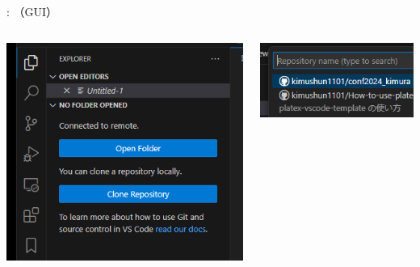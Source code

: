 \documentclass[aspectratio=169,dvipdfmx,cjk]{beamer}
\begin{document}
\begin{frame}{\insertsection \thesubsection: \insertsubsection （GUI）}
\begin{columns}
\begin{column}{0.3\textwidth}
      \includegraphics[width=1.0\linewidth]{fig/clone-gui.png}
    \end{column}
    \begin{column}{0.3\textwidth}
      \includegraphics[width=1.0\linewidth]{fig/select-repo.png}
    \end{column}
  \end{columns}
\end{frame}
\end{document}
